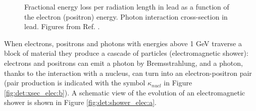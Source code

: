 \begin{figure}[ht]
\centering
{}
\caption{ Fractional energy loss per radiation length in lead as a function of the electron (positron) energy. 
 Photon interaction cross-section in lead. Figures from Ref. \cite{Patrignani:2016xqp}. }
\label{fig:det:xsec_elec}
\end{figure}


When electrons, positrons and photons with energies above 1 GeV traverse a block of material they produce a cascade of particles (electromagnetic shower): electrons and positrons can emit a photon by Bremsstrahlung, and a photon, thanks to the interaction with a nucleus, can turn into an electron-positron pair (pair production is indicated with the symbol $\kappa_{nucl}$ in Figure \ref{fig:det:xsec_elec:b}). A schematic view of the evolution of an electromagnetic shower is shown  in Figure \ref{fig:det:shower_elec:a}. 

